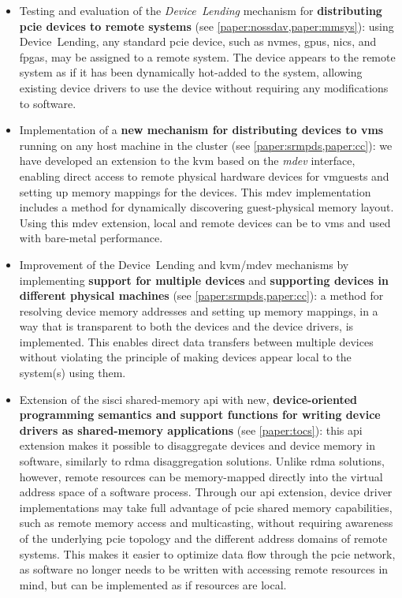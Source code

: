 \begin{itemize}
    \item Testing and evaluation of the \emph{Device~Lending} mechanism for \textbf{distributing \gls{pcie} devices to remote systems} (see \cref{paper:nossdav,paper:mmsys}): 
        using Device~Lending, any standard \gls{pcie} device, such as \glspl{nvme}, \glspl{gpu}, \glspl{nic}, and \glspl{fpga}, may be assigned to a remote system. 
        The device appears to the remote system as if it has been dynamically hot-added to the system, allowing existing device drivers to use the device without requiring any modifications to software.

    \item Implementation of a \textbf{new mechanism for distributing devices to \glspl{vm}} running on any host machine in the cluster (see \cref{paper:srmpds,paper:cc}): 
        we have developed an extension to the \gls{kvm} based on the \emph{\gls{mdev}} interface, enabling direct access to remote physical hardware devices for \glspl{vmguest} and setting up memory mappings for the devices. 
        This \gls{mdev} implementation includes a method for dynamically discovering \gls{guest}-physical memory layout. Using this \gls{mdev} extension, local and remote devices can be  to \glspl{vm} and used with bare-metal performance.
	
    \item Improvement of the Device~Lending and \gls{kvm}/\gls{mdev} mechanisms by implementing \textbf{support for multiple devices} and \textbf{supporting devices in different physical machines} (see \cref{paper:srmpds,paper:cc}):
        a method for resolving device memory addresses and setting up memory mappings, in a way that is transparent to both the devices and the device drivers, is implemented. 
        This enables direct data transfers between multiple devices without violating the principle of making devices appear local to the system(s) using them.

    \item Extension of the \gls{sisci} shared-memory \gls{api} with new, \textbf{device-oriented programming semantics and support functions for writing device drivers as shared-memory applications} (see \cref{paper:tocs}):
	this \gls{api} extension makes it possible to \gls{disaggregate} devices and device memory in software, similarly to \gls{rdma} \gls{disaggregation} solutions.
	Unlike \gls{rdma} solutions, however, remote resources can be memory-mapped directly into the virtual address space of a software process.
	Through our \gls{api} extension, device driver implementations may take full advantage of \gls{pcie} shared memory capabilities, such as remote memory access and multicasting, without requiring awareness of the underlying \gls{pcie} topology and the different address domains of remote systems.
	This makes it easier to optimize data flow through the \gls{pcie} network, as software no longer needs to be written with accessing remote resources in mind, but can be implemented as if resources are local.


\end{itemize}
